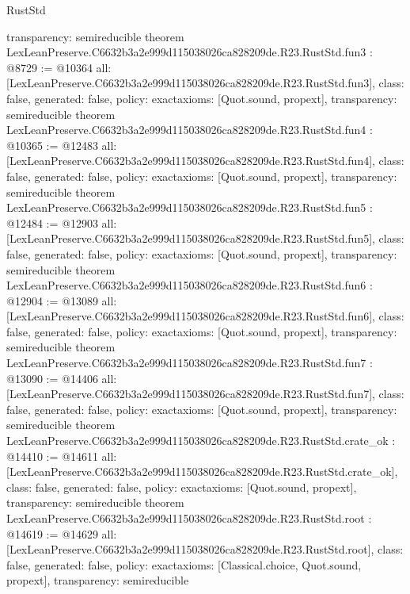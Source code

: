 \begin{lexlean}{RustStd}
\begin{coremodule}
{  transparency: semireducible
}
theorem LexLeanPreserve.C6632b3a2e999d115038026ca828209de.R23.RustStd.fun3 : @8729 := @10364 {
  all: [LexLeanPreserve.C6632b3a2e999d115038026ca828209de.R23.RustStd.fun3],
  class: false,
  generated: false,
  policy: exact{axioms: [Quot.sound, propext]},
  transparency: semireducible
}
theorem LexLeanPreserve.C6632b3a2e999d115038026ca828209de.R23.RustStd.fun4 : @10365 := @12483 {
  all: [LexLeanPreserve.C6632b3a2e999d115038026ca828209de.R23.RustStd.fun4],
  class: false,
  generated: false,
  policy: exact{axioms: [Quot.sound, propext]},
  transparency: semireducible
}
theorem LexLeanPreserve.C6632b3a2e999d115038026ca828209de.R23.RustStd.fun5 : @12484 := @12903 {
  all: [LexLeanPreserve.C6632b3a2e999d115038026ca828209de.R23.RustStd.fun5],
  class: false,
  generated: false,
  policy: exact{axioms: [Quot.sound, propext]},
  transparency: semireducible
}
theorem LexLeanPreserve.C6632b3a2e999d115038026ca828209de.R23.RustStd.fun6 : @12904 := @13089 {
  all: [LexLeanPreserve.C6632b3a2e999d115038026ca828209de.R23.RustStd.fun6],
  class: false,
  generated: false,
  policy: exact{axioms: [Quot.sound, propext]},
  transparency: semireducible
}
theorem LexLeanPreserve.C6632b3a2e999d115038026ca828209de.R23.RustStd.fun7 : @13090 := @14406 {
  all: [LexLeanPreserve.C6632b3a2e999d115038026ca828209de.R23.RustStd.fun7],
  class: false,
  generated: false,
  policy: exact{axioms: [Quot.sound, propext]},
  transparency: semireducible
}
theorem LexLeanPreserve.C6632b3a2e999d115038026ca828209de.R23.RustStd.crate_ok : @14410 := @14611 {
  all: [LexLeanPreserve.C6632b3a2e999d115038026ca828209de.R23.RustStd.crate_ok],
  class: false,
  generated: false,
  policy: exact{axioms: [Quot.sound, propext]},
  transparency: semireducible
}
theorem LexLeanPreserve.C6632b3a2e999d115038026ca828209de.R23.RustStd.root : @14619 := @14629 {
  all: [LexLeanPreserve.C6632b3a2e999d115038026ca828209de.R23.RustStd.root],
  class: false,
  generated: false,
  policy: exact{axioms: [Classical.choice, Quot.sound, propext]},
  transparency: semireducible
}


\end{coremodule}
\end{lexlean}
